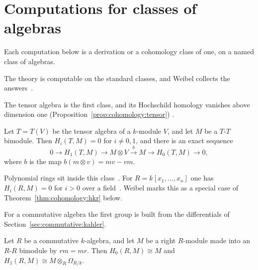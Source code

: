 \section{Computations for classes of algebras}\label{sec:cohomology:computations}

Each computation below is a derivation or a cohomology class of one, on a named class of algebras.

The theory is computable on the standard classes, and Weibel collects the
answers~\cite[\S 9]{Weibel1994}.

The tensor algebra is the first class, and its Hochschild homology vanishes
above dimension one (Proposition~\ref{prop:cohomology:tensor})
\cite[Proposition~9.1.6, pp.~303--304]{Weibel1994}.\begin{proposition}\label{prop:cohomology:tensor}
Let $T = T(V)$ be the tensor algebra of a $k$-module $V$, and let $M$ be a
$T$-$T$ bimodule. Then $H_i(T, M) = 0$ for $i \neq 0, 1$, and there is an exact
sequence
\[
0 \longrightarrow H_1(T, M) \longrightarrow M \otimes V \xrightarrow{\;b\;} M
\longrightarrow H_0(T, M) \longrightarrow 0,
\]
where $b$ is the map $b(m \otimes v) = mv - vm$.
\end{proposition}

Polynomial rings sit inside this class~\cite[Exercise~9.1.3, p.~304]{Weibel1994}.
For $R = k[x_1, \dots, x_n]$ one has $H_i(R, M) = 0$ for $i > 0$ over a
field~\cite[Exercise~9.1.3, p.~304]{Weibel1994}. Weibel marks this as a special
case of Theorem~\ref{thm:cohomology:hkr} below.

For a commutative algebra the first group is built from the differentials of
Section~\ref{sec:commutative:kahler}.

\begin{proposition}\label{prop:cohomology:comm-h1}
Let $R$ be a commutative $k$-algebra, and let $M$ be a right $R$-module made into
an $R$-$R$ bimodule by $rm = mr$. Then $H_0(R, M) \cong M$ and
$H_1(R, M) \cong M \otimes_R \Omega_{R/k}$.
\end{proposition}

